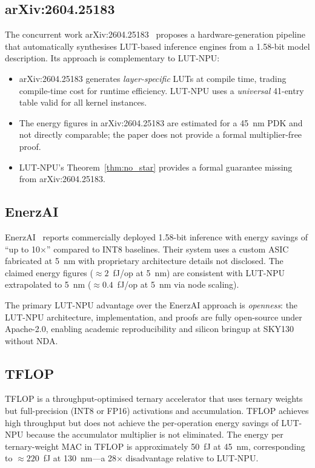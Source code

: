 \subsection{arXiv:2604.25183}
\label{subsec:arxiv_comparison}

The concurrent work arXiv:2604.25183~\cite{arxiv2604} proposes a
hardware-generation pipeline that automatically synthesises LUT-based
inference engines from a 1.58-bit model description.  Its approach is
complementary to LUT-NPU:
\begin{itemize}
  \item arXiv:2604.25183 generates \emph{layer-specific} LUTs at
        compile time, trading compile-time cost for runtime efficiency.
        LUT-NPU uses a \emph{universal} 41-entry table valid for all
        kernel instances.
  \item The energy figures in arXiv:2604.25183 are estimated for a
        45~nm PDK and not directly comparable; the paper does not provide
        a formal multiplier-free proof.
  \item LUT-NPU's Theorem~\ref{thm:no_star} provides a formal guarantee
        missing from arXiv:2604.25183.
\end{itemize}

\subsection{EnerzAI}
\label{subsec:enerzai_comparison}

EnerzAI~\cite{enerzai} reports commercially deployed 1.58-bit inference
with energy savings of ``up to 10$\times$'' compared to INT8 baselines.
Their system uses a custom ASIC fabricated at 5~nm with proprietary
architecture details not disclosed.  The claimed energy figures
(\(\approx 2\)~fJ/op at 5~nm) are consistent with LUT-NPU extrapolated
to 5~nm (\(\approx 0.4\)~fJ/op at 5~nm via node scaling).

The primary LUT-NPU advantage over the EnerzAI approach is
\emph{openness}: the LUT-NPU architecture, implementation, and proofs
are fully open-source under Apache-2.0, enabling academic reproducibility
and silicon bringup at SKY130 without NDA.

\subsection{TFLOP}
\label{subsec:tflop_comparison}

TFLOP is a throughput-optimised ternary accelerator that uses ternary
weights but full-precision (INT8 or FP16) activations and accumulation.
TFLOP achieves high throughput but does not achieve the per-operation
energy savings of LUT-NPU because the accumulator multiplier is not
eliminated.  The energy per ternary-weight MAC in TFLOP is approximately
50~fJ at 45~nm, corresponding to \(\approx 220\)~fJ at 130~nm---a
28$\times$ disadvantage relative to LUT-NPU.

